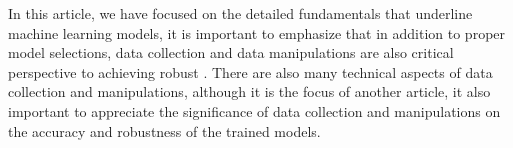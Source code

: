 
\par
In this article, we have focused on the detailed fundamentals that underline machine learning models, it is important to emphasize that in addition to proper model selections, data collection and data manipulations are also critical perspective to achieving robust . There are also many technical aspects of data collection and manipulations, although it is the focus of another article, it also important to appreciate the significance of data collection and manipulations on the accuracy and robustness of the trained models.
\par 
